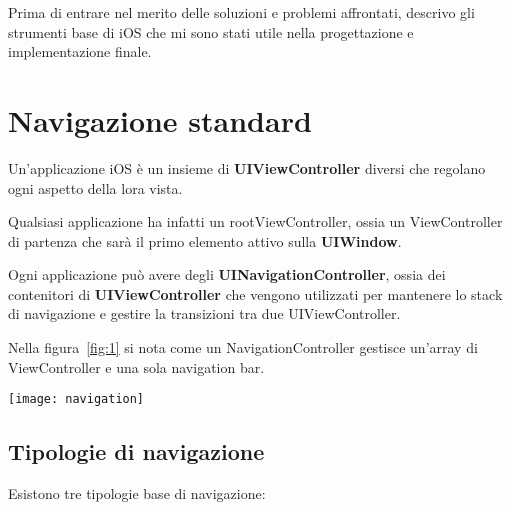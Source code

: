 

Prima di entrare nel merito delle soluzioni e problemi affrontati, descrivo gli strumenti
base di iOS che mi sono stati utile nella progettazione e implementazione finale.

\section{Navigazione standard}

Un'applicazione iOS è un insieme di \textbf{UIViewController}\cite{viewcontroller} diversi che 
regolano ogni aspetto della lora vista.

Qualsiasi applicazione ha infatti un rootViewController, ossia un ViewController di partenza
che sarà il primo elemento attivo sulla \textbf{UIWindow}.

Ogni applicazione può avere degli \textbf{UINavigationController}\cite{navigationcontroller},
ossia dei contenitori di \textbf{UIViewController} che vengono
utilizzati per mantenere lo stack di navigazione e gestire la transizioni tra due UIViewController.

Nella figura~\ref{fig:1} si nota come un NavigationController gestisce un'array di ViewController e una sola 
navigation bar. \\

\begin{minipage}{\linewidth}
    \centering
    \texttt{[image: navigation]}
    \label{fig:1}
\end{minipage}

\subsection{Tipologie di navigazione}\label{sec:navigation}

Esistono tre tipologie base di navigazione:

